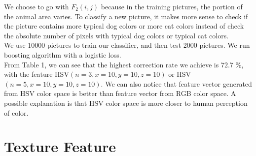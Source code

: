\documentclass[12pt]{article}
\begin{document}
We choose to go with $F_2(i, j)$ because in the training pictures, the portion of the animal area varies. To classify a new picture, it makes more sense to check if the picture contains more typical dog colors or more cat colors instead of check the absolute number of pixels with typical dog colors or typical cat colors. \\
We use 10000 pictures to train our classifier, and then test 2000 pictures. We run boosting algorithm with a logistic loss.\\
From Table 1, we can see that the highest correction rate we achieve is 72.7 \%, with the feature HSV$(n =3 ,x = 10, y = 10, z = 10)$ or HSV$(n =5 ,x = 10, y = 10, z = 10)$. We can also notice that feature vector generated from HSV color space is better than feature vector from RGB color space.  A possible explanation is that HSV color space is more closer to human perception of color. 


\section{Texture Feature}
\end{document}
